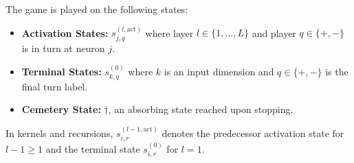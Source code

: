 \begin{definition}\label{ptnb:def:adf-game-states} The game is played on the following states:
\begin{itemize}
    \item \textbf{Activation States:} $s_{j,q}^{(l, \mathrm{act})}$ where layer $l \in \{1, \dots, L\}$ and
        player $q \in \{+,-\}$ is in turn at neuron $j$.
    \item \textbf{Terminal States:} $s_{k,q}^{(0)}$ where $k$ is an input dimension and $q \in \{+,-\}$ is
        the final turn label.
    \item \textbf{Cemetery State:} $\dagger$, an absorbing state reached upon stopping.
\end{itemize}
In kernels and recursions, $s_{i,r}^{(l-1,\mathrm{act})}$ denotes the predecessor activation state
for $l-1\ge1$ and the terminal state $s_{i,r}^{(0)}$ for $l=1$.
\end{definition}

